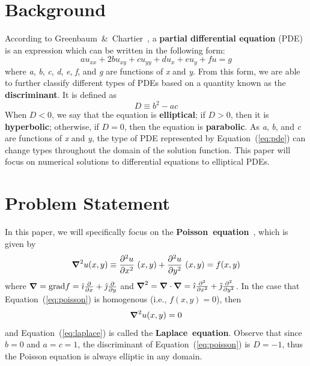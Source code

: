 \documentclass[12pt, titlepage]{article}
\title{\mytitle}
\author{Jaden Nola}
\date{2 May 2023}
\begin{document}
    \maketitle
    \section{Background}
    According to Greenbaum~\&~Chartier~\cite{greenbaum}, a \textbf{partial differential equation} (PDE) is an expression which can be written
    in the following form:
    \begin{equation}\label{eq:pde}
        au_{xx} + 2bu_{xy} + cu_{yy} + du_{x} + eu_{y} + fu = g
    \end{equation}
    where \textit{a}, \textit{b}, \textit{c}, \textit{d}, \textit{e}, \textit{f}, and \textit{g} are functions of \textit{x} and \textit{y}.
    From this form, we are able to further classify different types of PDEs based on a quantity known as
    the \textbf{discriminant}. It is defined as
    \begin{equation}
        D \equiv b^2 - ac
    \end{equation}
    When $D < 0$, we say that the equation is \textbf{elliptical}; if $D > 0$, then it is \textbf{hyperbolic}; 
    otherwise, if $D = 0$, then the equation is \textbf{parabolic}. As \textit{a}, \textit{b}, and \textit{c} are functions of \textit{x} and \textit{y},
    the type of PDE represented by Equation~(\ref{eq:pde}) can change types throughout the domain of the solution function.
    This paper will focus on numerical solutions to differential equations to elliptical PDEs.  
    \section{Problem Statement}
    In this paper, we will specifically focus on the \textbf{Poisson~equation}~\cite{burden_faires_2011}, which is given by
    \begin{equation}\label{eq:poisson}
        \grad^2 u(x,y) \equiv \pdv[2]{u}{x}~(x,y) + \pdv[2]{u}{y}~(x,y) = f(x,y)
    \end{equation}
    where $\grad = \text{grad}f = \hat{\imath}\pdv{x} + \hat{\jmath}\pdv{y}$ and $\grad^2 = \grad \cdot \grad = \hat{\imath}\pdv[2]{x} + \hat{\jmath}\pdv[2]{y}$.
    In the case that Equation~(\ref{eq:poisson}) is homogenous (i.e., $f(x,y)=0$), then
    \begin{equation}\label{eq:laplace}
        \grad^2 u(x,y) = 0
    \end{equation}
    and Equation~(\ref{eq:laplace}) is called the \textbf{Laplace~equation}. Observe that since $b = 0$ and $a = c = 1$, 
    the discriminant of Equation~(\ref{eq:poisson}) is $D=-1$, thus the Poisson equation is always elliptic in any domain.
\end{document}
